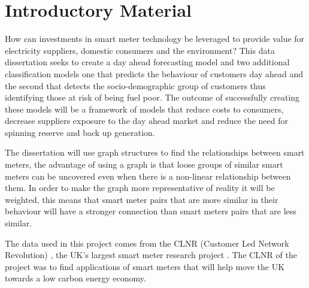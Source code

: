 \chapter{Introductory Material}
\label{Intro}

How can investments in smart meter technology be leveraged to provide value for electricity suppliers, domestic consumers and the environment? This data dissertation seeks to create a day ahead forecasting model and two additional classification models one that predicts the behaviour of customers day ahead and the second that detects the socio-demographic group of customers thus identifying those at risk of being fuel poor. The outcome of successfully creating these models will be a framework of models that reduce costs to consumers, decrease suppliers exposure to the day ahead market and reduce the need for spinning reserve and back up generation.

The dissertation will use graph structures to find the relationships between smart meters, the advantage of using a graph is that loose groups of similar smart meters can be uncovered even when there is a non-linear relationship between them. In order to make the graph more representative of reality it will be weighted, this means that smart meter pairs that are more similar in their behaviour will have a stronger connection than smart meters pairs that are less similar.

The data used in this project comes from the CLNR (Customer Led Network Revolution) \cite{customerlednetworkrevolution}, the UK's largest smart meter research project \cite{durhamenergyinstitutecustomerlednetworkrevolutiondurhamuniversity}. The CLNR of the project was to find applications of smart meters that will help move the UK towards a low carbon energy economy.


